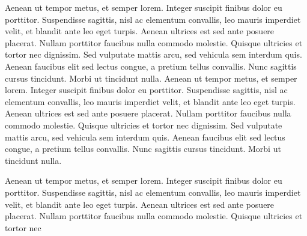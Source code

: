  Aenean ut tempor metus, et semper lorem. Integer suscipit finibus dolor eu porttitor. Suspendisse sagittis, nisl ac elementum convallis, leo mauris imperdiet velit, et blandit ante leo eget turpis. Aenean ultrices est sed ante posuere placerat. Nullam porttitor faucibus nulla commodo molestie. Quisque ultricies et tortor nec dignissim. Sed vulputate mattis arcu, sed vehicula sem interdum quis. Aenean faucibus elit sed lectus congue, a pretium tellus convallis. Nunc sagittis cursus tincidunt. Morbi ut tincidunt nulla.
 Aenean ut tempor metus, et semper lorem. Integer suscipit finibus dolor eu porttitor. Suspendisse sagittis, nisl ac elementum convallis, leo mauris imperdiet velit, et blandit ante leo eget turpis. Aenean ultrices est sed ante posuere placerat. Nullam porttitor faucibus nulla commodo molestie. Quisque ultricies et tortor nec dignissim. Sed vulputate mattis arcu, sed vehicula sem interdum quis. Aenean faucibus elit sed lectus congue, a pretium tellus convallis. Nunc sagittis cursus tincidunt. Morbi ut tincidunt nulla.

 Aenean ut tempor metus, et semper lorem. Integer suscipit finibus dolor eu porttitor. Suspendisse sagittis, nisl ac elementum convallis, leo mauris imperdiet velit, et blandit ante leo eget turpis. Aenean ultrices est sed ante posuere placerat. Nullam porttitor faucibus nulla commodo molestie. Quisque ultricies et tortor nec